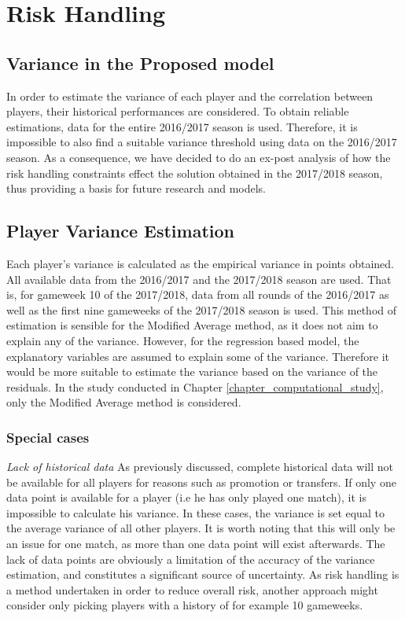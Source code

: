  
\section{Risk Handling} \label{exp_setup_Value_Variance}

\subsection{Variance in the Proposed model}

In order to estimate the variance of each player and the correlation between players, their historical performances are considered. To obtain reliable estimations, data for the entire 2016/2017 season is used. Therefore, it is impossible to also find a suitable variance threshold using data on the 2016/2017 season. As a consequence, we have decided to do an ex-post analysis of how the risk handling constraints effect the solution obtained in the 2017/2018 season, thus providing a basis for future research and models.

\subsection{Player Variance Estimation}

Each player's variance is calculated as the empirical variance in points obtained. All available data from the 2016/2017 and the 2017/2018 season are used. That is, for gameweek 10 of the 2017/2018, data from all rounds of the 2016/2017 as well as the first nine gameweeks of the 2017/2018 season is used. This method of estimation is sensible for the Modified Average method, as it does not aim to explain any of the variance. However, for the regression based model, the explanatory variables are assumed to explain some of the variance. Therefore it would be more suitable to estimate the variance based on the variance of the residuals. In the study conducted in Chapter \ref{chapter_computational_study}, only the Modified Average method is considered. 

\newpar

\subsubsection{Special cases}

\textit{Lack of historical data}
\newline
As previously discussed, complete historical data will not be available for all players for reasons such as promotion or transfers. If only one data point is available for a player (i.e he has only played one match), it is impossible to calculate his variance. In these cases, the variance is set equal to the average variance of all other players. It is worth noting that this will only be an issue for one match, as more than one data point will exist afterwards. The lack of data points are obviously a limitation of the accuracy of the variance estimation, and constitutes a significant source of uncertainty. As risk handling is a method undertaken in order to reduce overall risk, another approach might consider only picking players with a history of for example 10 gameweeks. \newpar

